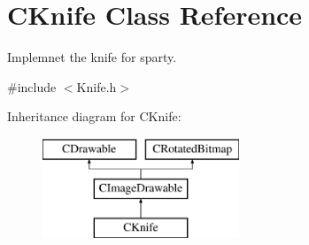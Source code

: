 \hypertarget{class_c_knife}{\section{C\+Knife Class Reference}
\label{class_c_knife}
}


Implemnet the knife for sparty.  




{\ttfamily \#include $<$Knife.\+h$>$}

Inheritance diagram for C\+Knife\+:\begin{figure}[H]
\begin{center}
\leavevmode
\includegraphics[height=3.000000cm]{class_c_knife}
\end{center}
\end{figure}

